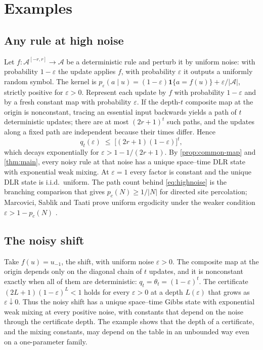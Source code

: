 \documentclass[11pt]{article}
\theoremstyle{plain}
\theoremstyle{definition}
\theoremstyle{remark}
\newcommand{\A}{\mathcal{A}}
\newcommand{\eps}{\varepsilon}
\begin{document}
\section{Examples}
\label{sec:examples}

\subsection{Any rule at high noise}
\label{sec:highnoise}

Let $f\colon\A^{[-r,r]}\to\A$ be a deterministic rule and perturb it by uniform noise: with probability $1-\eps$ the update applies $f$, with probability $\eps$ it outputs a uniformly random symbol. The kernel is $p_\eps(a\mid u)=(1-\eps)\mathbf 1\{a=f(u)\}+\eps/|\A|$, strictly positive for $\eps>0$. Represent each update by $f$ with probability $1-\eps$ and by a fresh constant map with probability $\eps$. If the depth-$t$ composite map at the origin is nonconstant, tracing an essential input backwards yields a path of $t$ deterministic updates; there are at most $(2r+1)^t$ such paths, and the updates along a fixed path are independent because their times differ. Hence
\begin{equation}
q_t(\eps)\;\le\;\bigl[(2r+1)(1-\eps)\bigr]^t,
\label{eq:highnoise}
\end{equation}
which decays exponentially for $\eps>1-1/(2r+1)$. By \cref{prop:common-map} and \cref{thm:main}, every noisy rule at that noise has a unique space--time DLR state with exponential weak mixing. At $\eps=1$ every factor is constant and the unique DLR state is i.i.d.\ uniform. The path count behind \eqref{eq:highnoise} is the branching comparison that gives $p_c(N)\ge1/|N|$ for directed site percolation; Marcovici, Sablik and Taati prove uniform ergodicity under the weaker condition $\eps>1-p_c(N)$ \cite[Corollary~3.7]{MSTaati19}.

\subsection{The noisy shift}

Take $f(u)=u_{-1}$, the shift, with uniform noise $\eps>0$. The composite map at the origin depends only on the diagonal chain of $t$ updates, and it is nonconstant exactly when all of them are deterministic: $q_t=\theta_t=(1-\eps)^t$. The certificate $(2L+1)(1-\eps)^L<1$ holds for every $\eps>0$ at a depth $L(\eps)$ that grows as $\eps\downarrow0$. Thus the noisy shift has a unique space--time Gibbs state with exponential weak mixing at every positive noise, with constants that depend on the noise through the certificate depth. The example shows that the depth of a certificate, and the mixing constants, may depend on the table in an unbounded way even on a one-parameter family.
\end{document}
